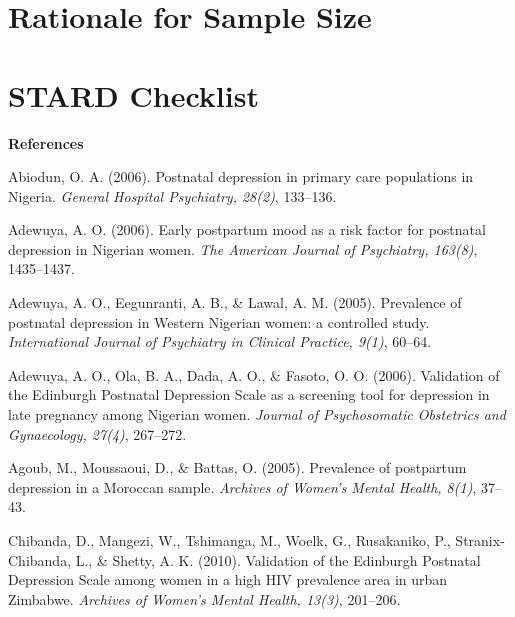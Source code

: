 \documentclass[man,natbib,longtable]{apa6}\usepackage[]{graphicx}\usepackage[]{color}
\begin{document}
\newpage
\section{Rationale for Sample Size}
\label{app:sample}


\newpage
\section{STARD Checklist}
\label{app:stard}


\newpage

{\parindent0pt

\textbf{References}

Abiodun, O. A. (2006). Postnatal depression in primary care populations in Nigeria. \textit{General Hospital Psychiatry, 28(2)}, 133--136.

\vspace{0.25cm}

Adewuya, A. O. (2006). Early postpartum mood as a risk factor for postnatal depression in Nigerian women. \textit{The American Journal of Psychiatry, 163(8)}, 1435--1437.

\vspace{0.25cm}

Adewuya, A. O., Eegunranti, A. B., \& Lawal, A. M. (2005). Prevalence of postnatal depression in Western Nigerian women: a controlled study. \textit{International Journal of Psychiatry in Clinical Practice, 9(1)}, 60--64.

\vspace{0.25cm}

Adewuya, A. O., Ola, B. A., Dada, A. O., \& Fasoto, O. O. (2006). Validation of the Edinburgh Postnatal Depression Scale as a screening tool for depression in late pregnancy among Nigerian women. \textit{Journal of Psychosomatic Obstetrics and Gynaecology, 27(4)}, 267--272.

\vspace{0.25cm}

Agoub, M., Moussaoui, D., \& Battas, O. (2005). Prevalence of postpartum depression in a Moroccan sample. \textit{Archives of Women’s Mental Health, 8(1)}, 37--43.

\vspace{0.25cm}

Chibanda, D., Mangezi, W., Tshimanga, M., Woelk, G., Rusakaniko, P., Stranix-Chibanda, L., \& Shetty, A. K. (2010). Validation of the Edinburgh Postnatal Depression Scale among women in a high HIV prevalence area in urban Zimbabwe. \textit{Archives of Women’s Mental Health, 13(3)}, 201--206.

}
\end{document}
